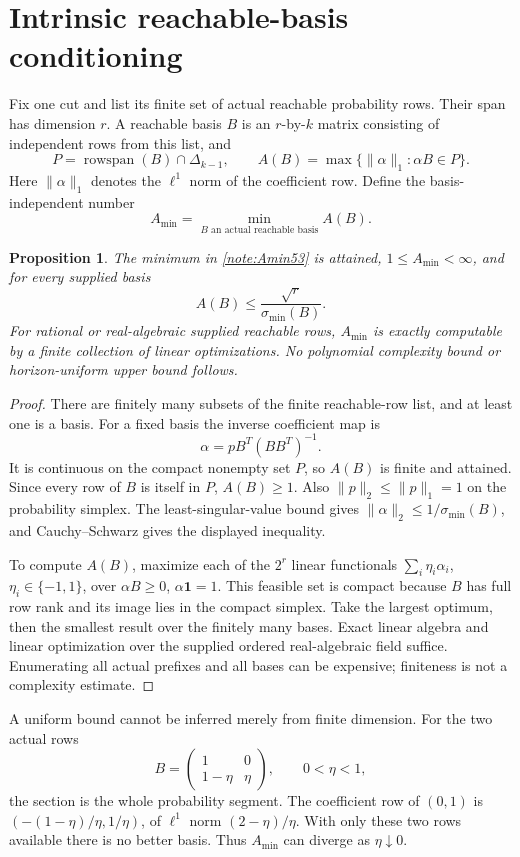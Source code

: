 \documentclass[11pt]{amsart}
\numberwithin{equation}{section}
\newtheorem{proposition}{Proposition}[section]
\newcommand{\norm}[1]{\lVert#1\rVert}
\begin{document}
\section{Intrinsic reachable-basis conditioning}
Fix one cut and list its finite set of actual reachable probability rows. Their span has dimension $r$. A reachable basis $B$ is an $r$-by-$k$ matrix consisting of independent rows from this list, and
\[
 P=\operatorname{rowspan}(B)\cap\Delta_{k-1},\qquad
 A(B)=\max\{\norm\alpha_1:\alpha B\in P\}.
\]
Here $\norm\alpha_1$ denotes the $\ell^1$ norm of the coefficient row. Define the basis-independent number
\begin{equation}\label{note:Amin53}
 A_{\min}=\min_{B\text{ an actual reachable basis}} A(B).
\end{equation}
\begin{proposition}\label{note:conditioning53}
The minimum in \eqref{note:Amin53} is attained, $1\le A_{\min}<\infty$, and for every supplied basis
\[
 A(B)\le\frac{\sqrt r}{\sigma_{\min}(B)}.
\]
For rational or real-algebraic supplied reachable rows, $A_{\min}$ is exactly computable by a finite collection of linear optimizations. No polynomial complexity bound or horizon-uniform upper bound follows.
\end{proposition}
\begin{proof}
There are finitely many subsets of the finite reachable-row list, and at least one is a basis. For a fixed basis the inverse coefficient map is
\[
                  \alpha=pB^T(BB^T)^{-1}.
\]
It is continuous on the compact nonempty set $P$, so $A(B)$ is finite and attained. Since every row of $B$ is itself in $P$, $A(B)\ge1$. Also $\norm p_2\le\norm p_1=1$ on the probability simplex. The least-singular-value bound gives $\norm\alpha_2\le1/\sigma_{\min}(B)$, and Cauchy--Schwarz gives the displayed inequality.

To compute $A(B)$, maximize each of the $2^r$ linear functionals $\sum_i\eta_i\alpha_i$, $\eta_i\in\{-1,1\}$, over $\alpha B\ge0$, $\alpha\mathbf1=1$. This feasible set is compact because $B$ has full row rank and its image lies in the compact simplex. Take the largest optimum, then the smallest result over the finitely many bases. Exact linear algebra and linear optimization over the supplied ordered real-algebraic field suffice. Enumerating all actual prefixes and all bases can be expensive; finiteness is not a complexity estimate.
\end{proof}
A uniform bound cannot be inferred merely from finite dimension. For the two actual rows
\[
 B=\begin{pmatrix}1&0\\1-\eta&\eta\end{pmatrix},\qquad0<\eta<1,
\]
the section is the whole probability segment. The coefficient row of $(0,1)$ is $(-(1-\eta)/\eta,1/\eta)$, of $\ell^1$ norm $(2-\eta)/\eta$. With only these two rows available there is no better basis. Thus $A_{\min}$ can diverge as $\eta\downarrow0$.
\end{document}
